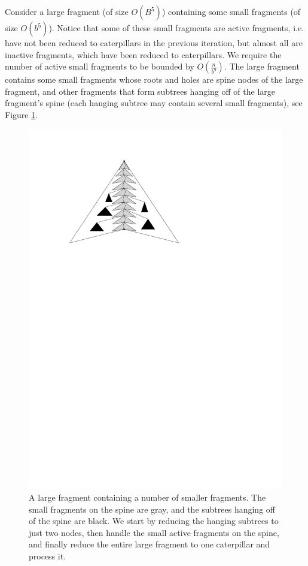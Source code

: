 \documentclass[11pt,a4paper]{article}
\theoremstyle{definition}
\theoremstyle{remark}
\begin{document}
Consider a large fragment (of size $O(B^5)$) containing some small fragments
(of size $O(b^5)$). Notice that some of these small fragments are active fragments, i.e. have not
been reduced to caterpillars in the previous iteration, but almost all are inactive fragments, which have
been reduced to caterpillars. We require the number of active small fragments
to be bounded by $O(\frac{n}{b^{9}})$.
The large fragment contains some small fragments whose roots and holes are spine nodes of the large fragment,
and other fragments that form subtrees hanging off of the large fragment's spine (each hanging subtree may
contain several small fragments), see Figure \ref{figure of small fragments inside a large fragment}.

\begin{figure}\label{figure of small fragments inside a large fragment}
\begin{center}
\includegraphics[scale=1]{refinement}
\end{center}
\caption{A large fragment containing a number of smaller fragments. The small fragments on the spine are gray, and the subtrees hanging off of the spine are black. We start by reducing the hanging subtrees to just two nodes, then handle the small active fragments on the spine, and finally reduce the entire large fragment to one caterpillar and process it.}
\end{figure}
\end{document}
